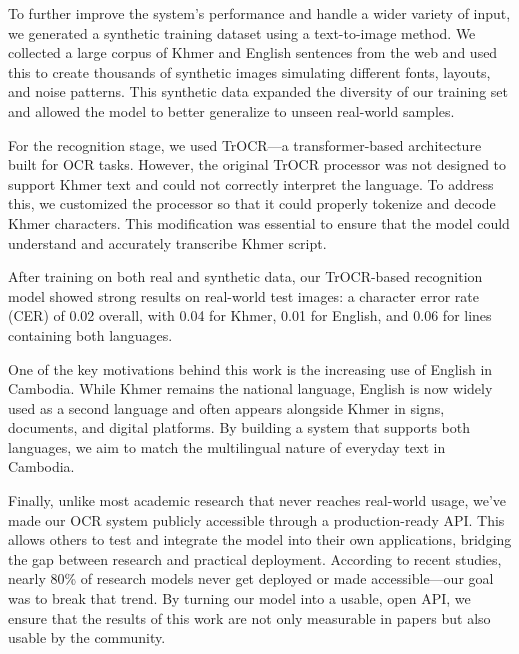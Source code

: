 \begin{adjustwidth}{0.2cm}{0.2cm}
    To further improve the system’s performance and handle a wider variety of input, 
    we generated a synthetic training dataset using a text-to-image method. We 
    collected a large corpus of Khmer and English sentences from the web and used 
    this to create thousands of synthetic images simulating different fonts, layouts, 
    and noise patterns. This synthetic data expanded the diversity of our training 
    set and allowed the model to better generalize to unseen real-world samples.
    
    For the recognition stage, we used TrOCR—a transformer-based architecture built 
    for OCR tasks. However, the original TrOCR processor was not designed to support 
    Khmer text and could not correctly interpret the language. To address this, 
    we customized the processor so that it could properly tokenize and decode Khmer 
    characters. This modification was essential to ensure that the model could 
    understand and accurately transcribe Khmer script.
    
    After training on both real and synthetic data, our TrOCR-based recognition model 
    showed strong results on real-world test images: a character error rate (CER) 
    of 0.02 overall, with 0.04 for Khmer, 0.01 for English, and 0.06 for lines 
    containing both languages.
    
    One of the key motivations behind this work is the increasing use of English 
    in Cambodia. While Khmer remains the national language, English is now widely 
    used as a second language and often appears alongside Khmer in signs, documents, 
    and digital platforms. By building a system that supports both languages, 
    we aim to match the multilingual nature of everyday text in Cambodia.
    
    Finally, unlike most academic research that never reaches real-world usage, 
    we’ve made our OCR system publicly accessible through a production-ready API. 
    This allows others to test and integrate the model into their own applications, 
    bridging the gap between research and practical deployment. According to recent 
    studies, nearly 80\% of research models never get deployed or made accessible—our 
    goal was to break that trend. By turning our model into a usable, open API, 
    we ensure that the results of this work are not only measurable in papers 
    but also usable by the community.


    
    \end{adjustwidth}